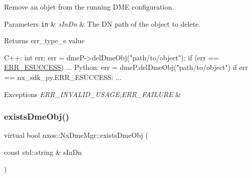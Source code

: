 Remove an objet from the running D\+ME configuration. 
\begin{DoxyParams}[1]{Parameters}
\mbox{\tt in}  & {\em s\+In\+Dn} & The DN path of the object to delete. \\
\hline
\end{DoxyParams}
\begin{DoxyReturn}{Returns}
err\+\_\+type\+\_\+e value 
\begin{DoxyCode}
C++:
    \textcolor{keywordtype}{int} err;
    err = dmeP->delDmeObj(\textcolor{stringliteral}{"path/to/object"});
    \textcolor{keywordflow}{if} (err == \mbox{\hyperlink{namespacenxos_ab37a154d6e66b6fabe61025ba9f523e1a02b0f4aa199a01d3e506e935467ba337}{ERR\_ESUCCESS}}) ...
Python:
    err = dmeP.delDmeObj(\textcolor{stringliteral}{"path/to/object"})
    \textcolor{keywordflow}{if} err == nx\_sdk\_py.ERR\_ESUCCESS:
         ...
\end{DoxyCode}

\end{DoxyReturn}

\begin{DoxyExceptions}{Exceptions}
{\em E\+R\+R\+\_\+\+I\+N\+V\+A\+L\+I\+D\+\_\+\+U\+S\+A\+GE,E\+R\+R\+\_\+\+F\+A\+I\+L\+U\+RE} & \\
\hline
\end{DoxyExceptions}
\mbox{\label{classnxos_1_1_nx_dme_mgr_aa21c3fd72667ddbafb2b288e15c89a92}} 
\subsubsection{\texorpdfstring{exists\+Dme\+Obj()}{existsDmeObj()}}
{\footnotesize\ttfamily virtual bool nxos\+::\+Nx\+Dme\+Mgr\+::exists\+Dme\+Obj (\begin{DoxyParamCaption}\item[{const std\+::string \&}]{s\+In\+Dn }\end{DoxyParamCaption})\hspace{0.3cm}{\ttfamily [pure virtual]}}

